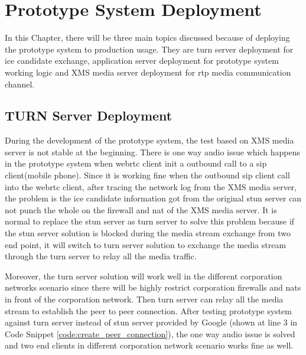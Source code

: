 \chapter{Prototype System Deployment}
\label{chp:sys_deploy}

\noindent In this Chapter, there will be three main topics discussed because of deploying the prototype system to production usage. They are \gls{turn} server deployment for \gls{ice} candidate exchange, application server deployment for prototype system working logic and XMS media server deployment for \gls{rtp} media communication channel.

\section{TURN Server Deployment}

\par During the development of the prototype system, the test based on XMS media server is not stable at the beginning. There is one way audio issue which happens in the prototype system when \gls{webrtc} client init a outbound call to a \gls{sip} client(mobile phone). Since it is working fine when the outbound \gls{sip} client call into the \gls{webrtc} client, after tracing the network log from the XMS media server, the problem is the \gls{ice} candidate information got from the original \gls{stun} server can not punch the whole on the firewall and \gls{nat} of the XMS media server. It is normal to replace the \gls{stun} server as \gls{turn} server to solve this problem because if the \gls{stun} server solution is blocked during the media stream exchange from two end point, it will switch to \gls{turn} server solution to exchange the media stream through the \gls{turn} server to relay all the media traffic.

\par Moreover, the \gls{turn} server solution will work well in the different corporation networks scenario since there will be highly restrict corporation firewalls and \gls{nat}s in front of the corporation network. Then \gls{turn} server can relay all the media stream to establish the peer to peer connection. After testing prototype system against \gls{turn} server instead of \gls{stun} server provided by Google (shown at line 3 in Code Snippet \ref{code:create_peer_connection}), the one way audio issue is solved and two end clients in different corporation network scenario works fine as well.

